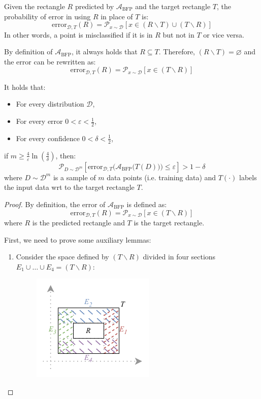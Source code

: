 Given the rectangle $R$ predicted by $\mathcal{A}_\text{BFP}$ and the target rectangle $T$,
the probability of error in using $R$ in place of $T$ is:
\[ \text{error}_{\mathcal{D}, T}(R) = \mathcal{P}_{x \sim \mathcal{D}} [ x \in (R \smallsetminus T) \cup (T \smallsetminus R) ] \]
In other words, a point is misclassified if it is in $R$ but not in $T$ or vice versa.
\begin{remark}
    By definition of $\mathcal{A}_\text{BFP}$, it always holds that $R \subseteq T$. 
    Therefore, $(R \smallsetminus T) = \varnothing$ and the error can be rewritten as:
    \[ \text{error}_{\mathcal{D}, T}(R) = \mathcal{P}_{x \sim \mathcal{D}} [ x \in (T \smallsetminus R) ] \]
\end{remark}


\begin{theorem}
    It holds that:
    \begin{itemize}
        \item For every distribution $\mathcal{D}$,
        \item For every error $0 < \varepsilon < \frac{1}{2}$, 
        \item For every confidence $0 < \delta < \frac{1}{2}$,
    \end{itemize} 
    if $m \geq \frac{4}{\varepsilon}\ln\left( \frac{4}{\delta} \right)$, then:
    \[ 
        \mathcal{P}_{D \sim \mathcal{D}^m}
            \left[ \text{error}_{\mathcal{D}, T}\Big( \mathcal{A}_\text{BFP}\big(T(D)\big) \Big) \leq \varepsilon \right]  > 1 - \delta
    \]
    where $D \sim \mathcal{D}^m$ is a sample of $m$ data points (i.e. training data)
    and $T(\cdot)$ labels the input data wrt to the target rectangle $T$.

    \begin{proof}
        By definition, the error of $\mathcal{A}_\text{BFP}$ is defined as:
        \[ \text{error}_{\mathcal{D}, T}(R) = \mathcal{P}_{x \sim \mathcal{D}} [ x \in (T \smallsetminus R) ] \]
        where $R$ is the predicted rectangle and $T$ is the target rectangle.

        First, we need to prove some auxiliary lemmas:
        \begin{enumerate}
            \item 
                Consider the space defined by $(T \smallsetminus R)$ divided in four sections $E_1 \cup \dots \cup E_4 = (T \smallsetminus R)$:
                \begin{figure}[H]
                    \centering
                    \includegraphics[width=0.35\linewidth]{./img/_rectangle_space.pdf}
                \end{figure}


\end{enumerate}
\end{proof}
\end{theorem}
